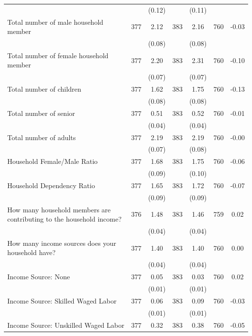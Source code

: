 \begin{tabular}{@{\extracolsep{5pt}}lcccccc}
 &   & (0.12)  &   & (0.11)  &   &  \\ [1ex]
Total number of male household member   & 377    & 2.12    & 383    & 2.16    & 760    & -0.03   \\
 &   & (0.08)  &   & (0.08)  &   &  \\ [1ex]
Total number of female household member   & 377    & 2.20    & 383    & 2.31    & 760    & -0.10   \\
 &   & (0.07)  &   & (0.07)  &   &  \\ [1ex]
Total number of children   & 377    & 1.62    & 383    & 1.75    & 760    & -0.13   \\
 &   & (0.08)  &   & (0.08)  &   &  \\ [1ex]
Total number of senior   & 377    & 0.51    & 383    & 0.52    & 760    & -0.01   \\
 &   & (0.04)  &   & (0.04)  &   &  \\ [1ex]
Total number of adults   & 377    & 2.19    & 383    & 2.19    & 760    & -0.00   \\
 &   & (0.07)  &   & (0.08)  &   &  \\ [1ex]
Household Female/Male Ratio   & 377    & 1.68    & 383    & 1.75    & 760    & -0.06   \\
 &   & (0.09)  &   & (0.10)  &   &  \\ [1ex]
Household Dependency Ratio   & 377    & 1.65    & 383    & 1.72    & 760    & -0.07   \\
 &   & (0.09)  &   & (0.09)  &   &  \\ [1ex]
How many household members are contributing to the household income?   & 376    & 1.48    & 383    & 1.46    & 759    & 0.02   \\
 &   & (0.04)  &   & (0.04)  &   &  \\ [1ex]
How many income sources does your household have?   & 377    & 1.40    & 383    & 1.40    & 760    & 0.00   \\
 &   & (0.04)  &   & (0.04)  &   &  \\ [1ex]
Income Source: None   & 377    & 0.05    & 383    & 0.03    & 760    & 0.02   \\
 &   & (0.01)  &   & (0.01)  &   &  \\ [1ex]
Income Source: Skilled Waged Labor   & 377    & 0.06    & 383    & 0.09    & 760    & -0.03   \\
 &   & (0.01)  &   & (0.01)  &   &  \\ [1ex]
Income Source: Unskilled Waged Labor   & 377    & 0.32    & 383    & 0.38    & 760    & -0.05   \\

\end{tabular}
